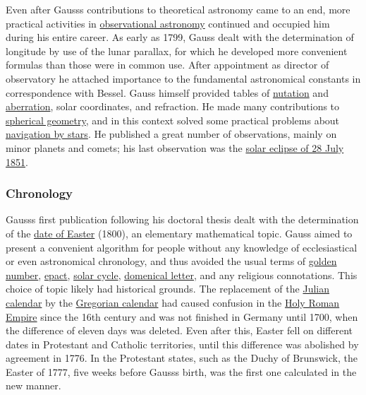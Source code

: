 Even after Gauss\textquotesingle s contributions to theoretical astronomy came to an end, more practical activities in \href{https://en.wikipedia.org/wiki/Observational_astronomy}{observational astronomy} continued and occupied him during his entire career. As early as 1799, Gauss dealt with the determination of longitude by use of the lunar parallax, for which he developed more convenient formulas than those were in common use. After appointment as director of observatory he attached importance to the fundamental astronomical constants in correspondence with Bessel. Gauss himself provided tables of \href{https://en.wikipedia.org/wiki/Astronomical_nutation}{nutation} and \href{https://en.wikipedia.org/wiki/Aberration_(astronomy)}{aberration}, solar coordinates, and refraction. He made many contributions to \href{https://en.wikipedia.org/wiki/Spherical_geometry}{spherical geometry}, and in this context solved some practical problems about \href{https://en.wikipedia.org/wiki/Celestial_navigation}{navigation by stars}. He published a great number of observations, mainly on minor planets and comets; his last observation was the \href{https://en.wikipedia.org/wiki/Solar_eclipse_of_28_July_1851?action=edit&redlink=1}{solar eclipse of 28 July 1851}.


\subsubsection{Chronology}\label{Chronology}

Gauss\textquotesingle s first publication following his doctoral thesis dealt with the determination of the \href{https://en.wikipedia.org/wiki/Date_of_Easter\#Gauss's_Easter_algorithm}{date of Easter} (1800), an elementary mathematical topic. Gauss aimed to present a convenient algorithm for people without any knowledge of ecclesiastical or even astronomical chronology, and thus avoided the usual terms of \href{https://en.wikipedia.org/wiki/Golden_number_(time)}{golden number}, \href{https://en.wikipedia.org/wiki/Epact}{epact}, \href{https://en.wikipedia.org/wiki/Solar_cycle_(calendar)}{solar cycle}, \href{https://en.wikipedia.org/wiki/Dominical_letter}{domenical letter}, and any religious connotations. This choice of topic likely had historical grounds. The replacement of the \href{https://en.wikipedia.org/wiki/Julian_calendar}{Julian calendar} by the \href{https://en.wikipedia.org/wiki/Gregorian_calendar}{Gregorian calendar} had caused confusion in the \href{https://en.wikipedia.org/wiki/Holy_Roman_Empire}{Holy Roman Empire} since the 16th century and was not finished in Germany until 1700, when the difference of eleven days was deleted. Even after this, Easter fell on different dates in Protestant and Catholic territories, until this difference was abolished by agreement in 1776. In the Protestant states, such as the Duchy of Brunswick, the Easter of 1777, five weeks before Gauss\textquotesingle s birth, was the first one calculated in the new manner.


